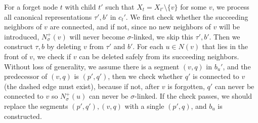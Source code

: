 \documentclass[a4paper,cleveref, autoref, 11pt, fleqn, thm-restate]{article}
\theoremstyle{plain}
\begin{document}
For a forget node $t$ with child $t'$ such that $X_t=X_{t'}\setminus \{v\}$ for some $v$, we process all canonical representations $\tau',b'$ in $c_t'$. We first check whether the succeeding neighbors of $v$ are connected, and if not, since no new neighbors of $v$ will be introduced, $N_{\sigma}^{+}(v)$ will never become $\sigma$-linked, we skip this $\tau',b'$. Then we construct $\tau,b$ by deleting $v$ from $\tau'$ and $b'$. For each $u\in N(v)$ that lies in the front of $v$, we check if $v$ can be deleted safely from its succeeding neighbors. Without loss of generality, we assume there is a segment $(v,q)$ in $b_u'$, and the predecessor of $(v,q)$ is $(p',q')$, then we check whether $q'$ is connected to $v$ (the dashed edge must exist), because if not, after $v$ is forgotten, $q'$ can never be connected to $v$ so $N_{\sigma}^{+}(u)$ can never be $\sigma$-linked. If the check passes, we should replace the segments $(p',q'), (v,q)$ with a single $(p',q)$, and $b_u$ is constructed.
\begin{center}
\end{center}
\end{document}

